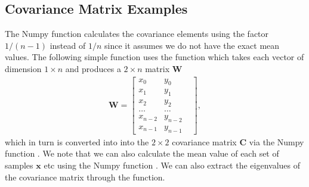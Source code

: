 \documentclass[letterpaper,10pt,english]{sphinxmanual}
\begin{document}
\subsection{Covariance Matrix Examples}
\label{\detokenize{chapter8:covariance-matrix-examples}}
The Numpy function  calculates the covariance elements using
the factor \(1/(n-1)\) instead of \(1/n\) since it assumes we do not have
the exact mean values.  The following simple function uses the
 function which takes each vector of dimension \(1\times n\)
and produces a \(2\times n\) matrix \(\boldsymbol{W}\)
\begin{equation*}
\begin{split}
\boldsymbol{W} = \begin{bmatrix} x_0 & y_0 \\
                          x_1 & y_1 \\
                          x_2 & y_2\\
                          \dots & \dots \\
                          x_{n-2} & y_{n-2}\\
                          x_{n-1} & y_{n-1} & 
             \end{bmatrix},
\end{split}
\end{equation*}
which in turn is converted into into the \(2\times 2\) covariance matrix
\(\boldsymbol{C}\) via the Numpy function . We note that we can also calculate
the mean value of each set of samples \(\boldsymbol{x}\) etc using the Numpy
function . We can also extract the eigenvalues of the
covariance matrix through the  function.

\begin{sphinxVerbatim}[commandchars=\\\{\}]
   
  
  
  
   
  
\end{sphinxVerbatim}
\end{document}

